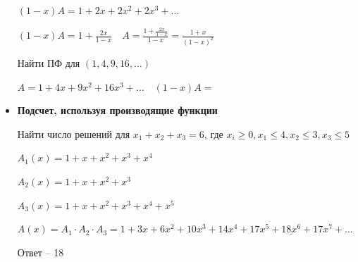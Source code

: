 \documentclass[12pt]{article}
\begin{document}
\begin{itemize}
        $(1 - x)A = 1 + 2x + 2x^2 + 2x^3 + \dots$

        $(1 - x)A = 1 + \frac{2x}{1 - x} \quad A = \frac{1 + \frac{2x}{1 - x}}{1 - x} = \frac{1 + x}{(1 - x)^2}$

        \Ex Найти ПФ для $(1, 4, 9, 16, \dots)$

        $A = 1 + 4x + 9x^2 + 16x^3 + \dots \quad (1 - x)A = $

        \item \textbf{Подсчет, используя производящие функции}

        Найти число решений для $x_1 + x_2 + x_3 = 6$, где $x_i \geq 0, x_1 \leq 4, x_2 \leq 3, x_3 \leq 5$

        $A_1(x) = 1 + x + x^2 + x^3 + x^4$

        $A_2(x) = 1 + x + x^2 + x^3$

        $A_3(x) = 1 + x + x^2 + x^3 + x^4 + x^5$

        $A(x) = A_1 \cdot A_2 \cdot A_3 = 1 + 3x + 6x^2 + 10x^3 + 14x^4 + 17x^5 + \underline{18x^6} + 17x^7 + \dots$

        Ответ -- 18

    \end{itemize}

\end{document}
